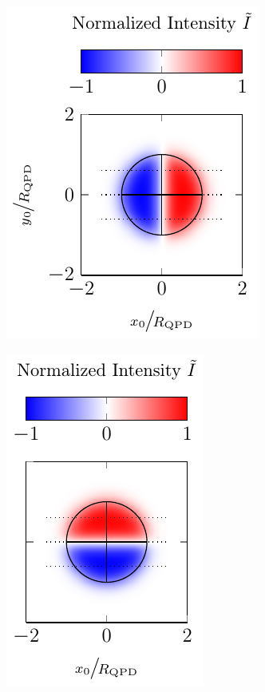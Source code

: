  \begin{figure}
  \centering
  \begin{subfigure}[b]{0.35\textwidth}
    \centering
    \includegraphics[]{Plots/cache/QPDx.pdf}
    \label{fig:Th-QPDx}
  \end{subfigure}
  \hfill
  \begin{subfigure}[b]{0.3\textwidth}
    \centering
    \includegraphics[]{Plots/cache/QPDy.pdf}

\end{subfigure}
\end{figure}
